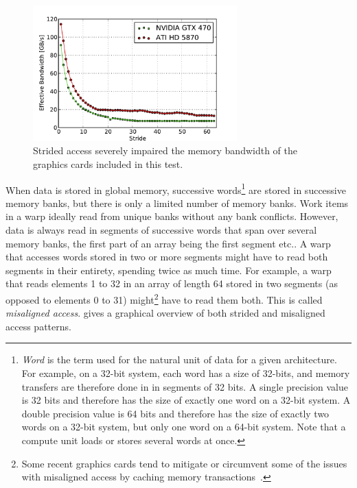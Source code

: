 \documentclass[11pt,twoside]{report}
\begin{document}
\begin{figure}[htbp]
	\vspace{-20pt}
	\begin{center}
		\includegraphics[width=0.70\textwidth]{img/strided_access.pdf}		
	\end{center}
	\vspace{-10pt}
	\caption{Strided access severely impaired the memory bandwidth of the graphics cards included in this test.}
	\label{fig:strided_access}
\end{figure}




\indent When data is stored in global memory, successive words\footnote{{\it Word} is the term used for the natural unit of data for a given architecture. For example, on a 32-bit system, each word has a size of 32-bits, and memory transfers are therefore done in in segments of 32 bits. A single precision value is 32 bits and therefore has the size of exactly one word on a 32-bit system. A double precision value is 64 bits and therefore has the size of exactly two words on a 32-bit system, but only one word on a 64-bit system. Note that a compute unit loads or stores several words at once.} are stored in successive memory banks, but there is only a limited number of memory banks.  Work items in a warp ideally read from unique banks without any bank conflicts. However, data is always read in segments of successive words that span over several memory banks, the first part of an array being the first segment etc.. A warp that accesses words stored in two or more segments might have to read both segments in their entirety, spending twice as much time. For example, a warp that reads elements 1 to 32 in an array of length 64 stored in two segments (as opposed to elements 0 to 31) might\footnote{Some recent graphics cards tend to mitigate or circumvent some of the issues with misaligned access by caching memory transactions~\cite{opencl.programming}.} have to read them both. This is called {\it misaligned access}.  gives a graphical overview of both strided and misaligned access patterns.
\end{document}
